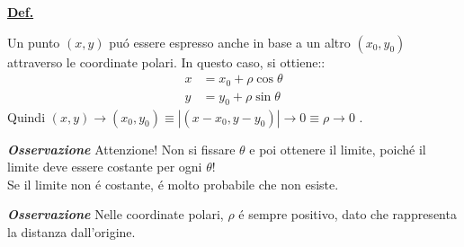 \documentclass[a4paper,10pt]{article} %
\newcommand{\ldef}[1]{%
    {\smallbreak\par\tiny\textbf{\underline{Def.}} {#1} \smallbreak}}
\newcommand{\loss}[1]{%
    {\smallbreak\par\tiny\emph{\textbf{Osservazione}} {#1} \par}}
\begin{document}
\begin{multicols}{6}




\ldef{
    Un punto $(x, y)$ puó essere espresso anche in base a un altro $(x_0, y_0)$
    attraverso le coordinate polari. In questo caso, si ottiene::
    \begin{align*}
        x &= x_0 + \rho \cos\theta \\
        y &= y_0 + \rho \sin\theta
    \end{align*}
    Quindi $(x,y) \rightarrow (x_0, y_0) \equiv | (x - x_0, y - y_0) | 
    \rightarrow 0 \equiv \rho \rightarrow 0$ .
    \loss{
        Attenzione! Non si fissare $\theta$ e poi ottenere il limite, poiché il 
        limite deve essere costante per ogni $\theta$! \\
        Se il limite non é costante,  é molto probabile che non esiste.
    }
    \loss{
        Nelle coordinate polari, $\rho$ \'e sempre positivo, dato che
        rappresenta la distanza dall'origine.
    }
}


\end{multicols}
\end{document}
